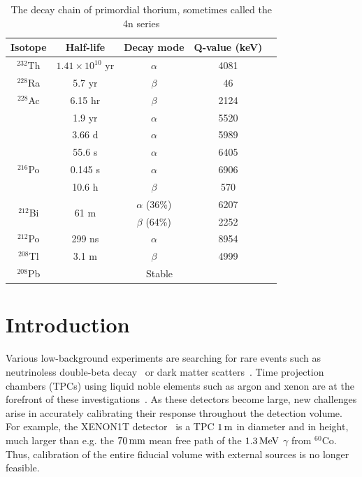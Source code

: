 \begin{table}[ht]
	\renewcommand{\arraystretch}{1.2}
	\begin{tabular}{| c | c | c | c | c |}
		\hline
		Isotope & Half-life & Decay mode & Q-value (keV) \\ \hline
		$^{232}$Th & $1.41\times10^{10}$ yr & $\alpha$ & 4081 \\ \hline
		$^{228}$Ra & 5.7 yr & $\beta$ & 46 \\ \hline
		$^{228}$Ac & 6.15 hr & $\beta$ & 2124 \\ \hline
		\Th & 1.9 yr & $\alpha$ & 5520 \\ \hline
		\Ra & 3.66 d & $\alpha$ & 5989 \\ \hline
		\Rn & 55.6 s & $\alpha$ & 6405 \\ \hline
		$^{216}$Po & 0.145 s & $\alpha$ & 6906 \\ \hline
		\Pb & 10.6 h & $\beta$ & 570  \\ \hline
		\multirow{2}{*}{$^{212}$Bi} & \multirow{2}{*}{61 m} & $\alpha$ (36\%)& 6207 \\
		& & $\beta$ (64\%)& 2252 \\ \hline
		$^{212}$Po & 299 ns & $\alpha$ & 8954 \\ \hline
		$^{208}$Tl & 3.1 m & $\beta$ & 4999 \\ \hline
		$^{208}$Pb & \multicolumn{3}{|c|}{Stable} \\
		\hline
	\end{tabular}
	\caption{The decay chain of primordial thorium, sometimes called the 4n series}
	\label{tab:th_chain}
\end{table}

\section{Introduction}\label{sec:introduction}

Various low-background experiments are searching for rare events such as neutrinoless double-beta decay~\cite{Pandola:2014naa} or dark matter scatters~\cite{Undagoitia:2015gya}. Time projection chambers (TPCs) using liquid noble elements such as argon and xenon are at the forefront of these investigations~\cite{Albert:2015ekt,Aprile:2013doa,Akerib:2015rjg,Amaudruz:2014nsa,Calvo:2015uln,Agnes:2015ftt}. As these detectors become large, new challenges arise in accurately calibrating their response throughout the detection volume. For example, the XENON1T detector~\cite{Aprile:2015uzo} is a TPC $1\, \mathrm{m}$ in diameter and in height, much larger than e.g. the $70\, \mathrm{mm}$ mean free path of the $1.3\, \mathrm{MeV}$ $\gamma$ from $^{60}$Co. Thus, calibration of the entire fiducial volume with external sources is no longer feasible.

